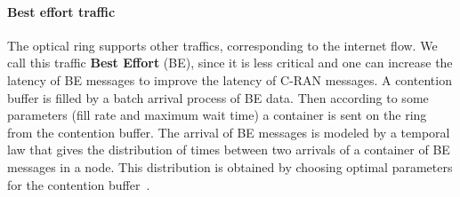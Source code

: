 \documentclass[]{algotel}
\begin{document}
%      
%  
   
%    
%   

% 
% 



\paragraph{Best effort traffic}

The optical ring supports other traffics, corresponding to the internet flow. We call this traffic \textbf{Best Effort} (BE), since it is less critical and one can increase the latency of BE messages to improve the latency of C-RAN messages. 
A contention buffer is filled by a batch arrival process of BE data. Then according to some parameters (fill rate and maximum wait time) a container is sent on the ring from the contention buffer. The arrival of BE messages is modeled by a temporal law that gives the distribution of times between two arrivals of a container of BE messages in a node. This distribution is obtained by choosing optimal parameters for the contention buffer~\cite{}. 
\end{document}
